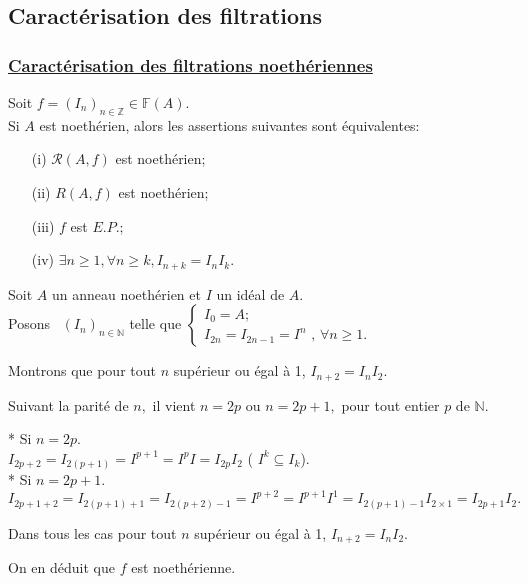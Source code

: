 \subsection{Caractérisation des filtrations}
\subsubsection{ \underline{Caractérisation des filtrations noethériennes}} 
\begin{maproposition}
	Soit $f=(I_{n})_{n \in \mathbb{Z}}\in \mathbb{F}(A).$ \\ Si $A$ est noethérien, alors les assertions suivantes sont équivalentes:
	\begin{enumerate}
		\item[(i)] $\mathcal{R}(A,f)$ est noethérien;
		\item[(ii)] $R(A,f)$ est noethérien;
		\item[(iii)] $f$ est $E.P.$;
		\item[(iv)] $\exists  n \geqslant 1,\forall n \geqslant k, I_{n+k} = I_nI_k$.
	\end{enumerate}
\end{maproposition}
\begin{monexemple}
	Soit $A$ un anneau noethérien et $I$ un idéal de $A$.\\
	Posons \ $(I_{n})_{n\in \mathbb{N}}$ telle que $\left\{ 
	\begin{array}{c}
		I_{0}=A ;\\ 
		I_{2n}=I_{2n-1}=I^{n}\text{ , }\forall n\geq 1.
	\end{array}
	\right. $
	
	Montrons que pour tout $n$ supérieur ou égal à 1, $I_{n+2}=I_{n}I_{2}$.
	
	Suivant la parité de $n,$ il vient $n=2p$ ou $n=2p+1,$ pour tout entier $p$ de $\mathbb{N}.$
	
	* Si $n=2p$. \\
	$I_{2p+2}=I_{2(p+1)}=I^{p+1}=I^{p}I=I_{2p}I_{2}$ ( $I^{k}\subseteq I_{k}$). \\
	* Si $n=2p+1$. \\
	$I_{2p+1+2}=I_{2(p+1)+1}=I_{2(p+2)-1}=I^{p+2}=I^{p+1}I^{1}=I_{2(p+1)-1}I_{2\times 1}=I_{2p+1}I_{2}.$
	
	Dans tous les cas pour tout  $n$ supérieur ou égal à 1, $I_{n+2}=I_{n}I_{2}.$
	
	On en déduit que $f$ est noethérienne.
\end{monexemple}

